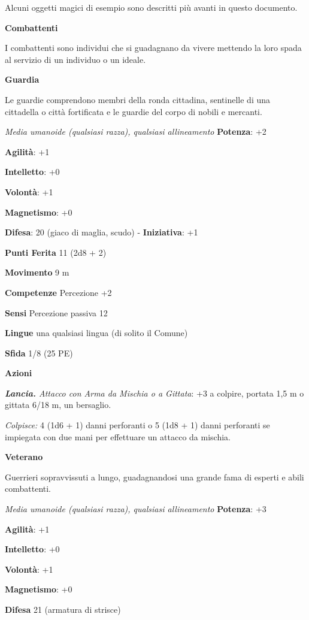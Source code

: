 \begin{multicols}{2}
Alcuni oggetti magici di esempio sono descritti più avanti in questo
documento.

\textbf{Combattenti}

I combattenti sono individui che si guadagnano da vivere mettendo la
loro spada al servizio di un individuo o un ideale.

\textbf{Guardia}

Le guardie comprendono membri della ronda cittadina, sentinelle di una
cittadella o città fortificata e le guardie del corpo di nobili e
mercanti.

\emph{Media umanoide (qualsiasi razza), qualsiasi allineamento}
\textbf{Potenza}: +2

\textbf{Agilità}: +1

\textbf{Intelletto}: +0

\textbf{Volontà}: +1

\textbf{Magnetismo}: +0

\textbf{Difesa}: 20 (giaco di maglia, scudo) - \textbf{Iniziativa}: +1

\textbf{Punti Ferita} 11 (2d8 + 2)

\textbf{Movimento} 9 m

\textbf{Competenze} Percezione +2

\textbf{Sensi} Percezione passiva 12

\textbf{Lingue} una qualsiasi lingua (di solito il Comune)

\textbf{Sfida} 1/8 (25 PE)

\textbf{Azioni}

\emph{\textbf{Lancia.} Attacco con Arma da Mischia o a Gittata}: +3 a
colpire, portata 1,5 m o gittata 6/18 m, un bersaglio.

\emph{Colpisce:} 4 (1d6 + 1) danni perforanti o 5 (1d8 + 1) danni
perforanti se impiegata con due mani per effettuare un attacco da
mischia.

\textbf{Veterano}

Guerrieri sopravvissuti a lungo, guadagnandosi una grande fama di
esperti e abili combattenti.

\emph{Media umanoide (qualsiasi razza), qualsiasi allineamento}
\textbf{Potenza}: +3

\textbf{Agilità}: +1

\textbf{Intelletto}: +0

\textbf{Volontà}: +1

\textbf{Magnetismo}: +0

\textbf{Difesa} 21 (armatura di strisce)


\end{multicols}
